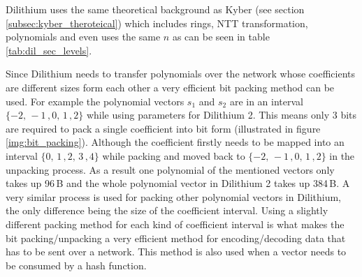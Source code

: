 Dilithium uses the same theoretical background as Kyber (see section \ref{subsec:kyber_theroteical}) which includes rings, NTT transformation, polynomials and even uses the same $n$ as can be seen in table \ref{tab:dil_sec_levels}.


Since Dilithium needs to transfer polynomials over the network whose coefficients are different sizes form each other a very efficient bit packing method can be used. For example the polynomial vectors $s_1$ and $s_2$ are in an interval $\{-2,\,-1\,,0,\,1\,,2\}$ while using parameters for Dilithium 2. This means only 3 bits are required to pack a single coefficient into bit form (illustrated in figure \ref{img:bit_packing}). Although the coefficient firstly needs to be mapped into an interval $\{0,\,1\,,2,\,3\,,4\}$ while packing and moved back to $\{-2,\,-1\,,0,\,1\,,2\}$ in the unpacking process. As a result one polynomial of the mentioned vectors only takes up 96\,B and the whole polynomial vector in Dilithium 2 takes up 384\,B. A very similar process is used for packing other polynomial vectors in Dilithium, the only difference being the size of the coefficient interval. Using a slightly different packing method for each kind of coefficient interval is what makes the bit packing/unpacking a very efficient method for encoding/decoding data that has to be sent over a network. This method is also used when a vector needs to be consumed by a hash function.

